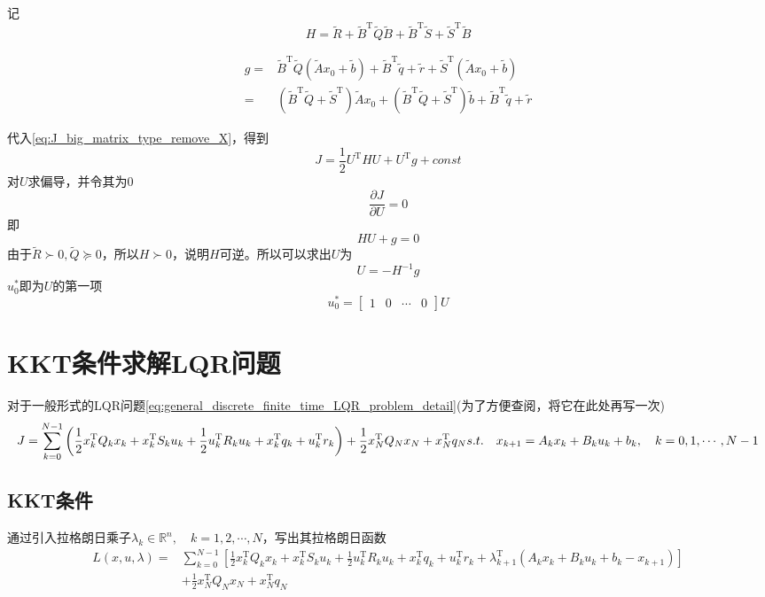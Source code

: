 \documentclass[withoutpreface,bwprint]{NoteBook}
\begin{document}
记
\begin{equation}
\label{eq:H_in_J}
H = \tilde{R}+\tilde{B}^\mathrm{T}\tilde{Q}\tilde{B} + \tilde{B}^\mathrm{T}\tilde{S} + \tilde{S}^\mathrm{T}\tilde{B} 
\end{equation}

\begin{align}
\label{eq:g_in_J}
g =& \tilde{B}^\mathrm{T}\tilde{Q} \left(\tilde{A}x_0 +\tilde{b} \right)
+ \tilde{B}^\mathrm{T}\tilde{q} 
+ \tilde{r} 
+ \tilde{S}^\mathrm{T} \left(\tilde{A}x_0 +\tilde{b} \right) \nonumber \\

=& \left( \tilde{B}^\mathrm{T}\tilde{Q} + \tilde{S}^\mathrm{T} \right) \tilde{A} x_0 
+ \left( \tilde{B}^\mathrm{T}\tilde{Q} + \tilde{S}^\mathrm{T} \right) \tilde{b} 
+\tilde{B}^\mathrm{T}\tilde{q} 
+ \tilde{r} 
\end{align}


代入\cref{eq:J_big_matrix_type_remove_X}，得到
$$
J=\frac{1}{2} U^\mathrm{T} H U 
+ U^\mathrm{T} g
+ const
$$
对$U$求偏导，并令其为0
$$
\frac{\partial J}{\partial U} = 0
$$
即
$$
H U + g = 0
$$
由于$\tilde{R} \succ 0, \tilde{Q} \succeq 0$，所以$H \succ 0$，说明$H$可逆。所以可以求出$U$为
$$
U= -H^{-1}g
$$
$u_0^*$即为$U$的第一项
$$
u_0^* = \begin{bmatrix}1 & 0 & \cdots & 0 \end{bmatrix}U
$$

\section{KKT条件求解LQR问题}

对于一般形式的LQR问题\cref{eq:general_discrete_finite_time_LQR_problem_detail}(为了方便查阅，将它在此处再写一次)
$$
J= \sum_{k=0}^{N-1} \left( \frac{1}{2}x_k^\mathrm{T} Q_k x_k
+ x_k^\mathrm{T} S_k u_k
+ \frac{1}{2}u_k^\mathrm{T} R_k u_k + x_k^\mathrm{T}q_k
+ u_k^\mathrm{T} r_k \right) 
+ \frac{1}{2}x_N^\mathrm{T} Q_N x_N + x_N^\mathrm{T}q_N\\

s.t.\quad  x_{k+1} = A_k x_k + B_k u_k + b_k, \quad k=0,1,\cdots,N-1
$$

\subsection{KKT条件}

通过引入拉格朗日乘子$\lambda_k \in \mathbb{R}^n,\quad k=1,2,\cdots,N$，写出其拉格朗日函数
\begin{equation}
\label{eq:Lagrange_func_of_J}
\begin{aligned}
L(x,u,\lambda) = &
 \sum_{k=0}^{N-1} \left[ \frac{1}{2}x_k^\mathrm{T} Q_k x_k
+ x_k^\mathrm{T} S_k u_k
+ \frac{1}{2}u_k^\mathrm{T} R_k u_k + x_k^\mathrm{T}q_k
+ u_k^\mathrm{T} r_k + \lambda_{k+1}^\mathrm{T} \left( A_k x_k + B_k u_k + b_k - x_{k+1} \right) \right]\\
& + \frac{1}{2}x_N^\mathrm{T} Q_N x_N + x_N^\mathrm{T}q_N
\end{aligned}
\end{equation}
\end{document}
